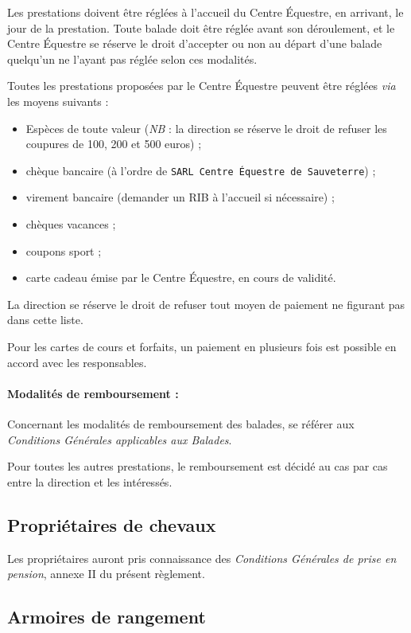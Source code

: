 \documentclass[11pt,a4paper]{article}
\begin{document}
Les prestations doivent être réglées à l'accueil du Centre Équestre, en arrivant, le jour de la prestation.
Toute balade doit être réglée avant son déroulement, et le Centre Équestre se réserve le droit d'accepter ou non au départ d'une balade quelqu'un ne l'ayant pas réglée selon ces modalités.

Toutes les prestations proposées par le Centre Équestre peuvent être réglées \textit{via} les moyens suivants :
\begin{itemize}[leftmargin=50pt]
  \item
  Espèces de toute valeur (\textit{NB} : la direction se réserve le droit de refuser les coupures de 100, 200 et 500 euros) ;
  \item
  chèque bancaire (à l'ordre de \texttt{SARL Centre Équestre de Sauveterre}) ;
  \item
  virement bancaire (demander un RIB à l'accueil si nécessaire) ;
  \item
  chèques vacances ;
  \item
  coupons sport ;
	\item carte cadeau émise par le Centre Équestre, en cours de validité.
\end{itemize}

La direction se réserve le droit de refuser tout moyen de paiement ne figurant pas dans cette liste.

Pour les cartes de cours et forfaits, un paiement en plusieurs fois est possible en accord avec les responsables.

\paragraph[Modalités de remboursement :  ]{Modalités de remboursement :\\}
Concernant les modalités de remboursement des balades, se référer aux \textit{Conditions Générales applicables aux Balades}.

Pour toutes les autres prestations, le remboursement est décidé au cas par cas entre la direction et les intéressés.


\subsection{Propriétaires de chevaux}\label{subsec:proprietaires-de-chevaux}
Les propriétaires auront pris connaissance des \textit{Conditions Générales de prise en pension}, annexe II du présent règlement.


\subsection{Armoires de rangement}\label{subsec:armoires-de-rangement}
\end{document}
